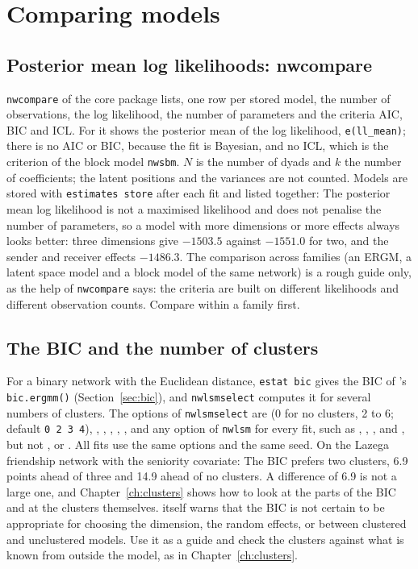 \chapter{Comparing models}\label{ch:compare}

\section{Posterior mean log likelihoods: nwcompare}

\texttt{nwcompare} of the core package lists, one row per stored model, the number of observations, the log likelihood, the number of parameters and the criteria AIC, BIC and ICL. For \nwlsm{} it shows the posterior mean of the log likelihood, \texttt{e(ll\_mean)}; there is no AIC or BIC, because the fit is Bayesian, and no ICL, which is the criterion of the block model \texttt{nwsbm}. $N$ is the number of dyads and $k$ the number of coefficients; the latent positions and the variances are not counted. Models are stored with \texttt{estimates store} after each fit and listed together:
The posterior mean log likelihood is not a maximised likelihood and does not penalise the number of parameters, so a model with more dimensions or more effects always looks better: three dimensions give $-1503.5$ against $-1551.0$ for two, and the sender and receiver effects $-1486.3$. The comparison across families (an ERGM, a latent space model and a block model of the same network) is a rough guide only, as the help of \texttt{nwcompare} says: the criteria are built on different likelihoods and different observation counts. Compare within a family first.

\section{The BIC and the number of clusters}

For a binary network with the Euclidean distance, \texttt{estat bic} gives the BIC of \latentnet{}'s \texttt{bic.ergmm()} (Section~\ref{sec:bic}), and \texttt{nwlsmselect} computes it for several numbers of clusters. The options of \texttt{nwlsmselect} are  (0 for no clusters, 2 to 6; default \texttt{0 2 3 4}), , , , , ,  and any option of \texttt{nwlsm} for every fit, such as , , ,  and , but not ,  or . All fits use the same options and the same seed. On the Lazega friendship network with the seniority covariate:
The BIC prefers two clusters, 6.9 points ahead of three and 14.9 ahead of no clusters. A difference of 6.9 is not a large one, and Chapter~\ref{ch:clusters} shows how to look at the parts of the BIC and at the clusters themselves. \latentnet{} itself warns that the BIC is not certain to be appropriate for choosing the dimension, the random effects, or between clustered and unclustered models. Use it as a guide and check the clusters against what is known from outside the model, as in Chapter~\ref{ch:clusters}.


